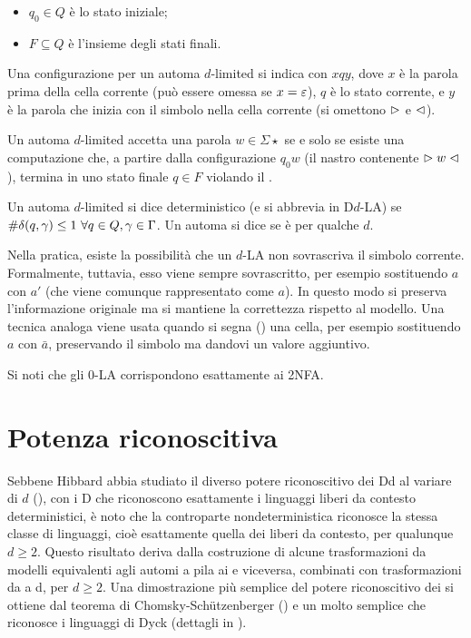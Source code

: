 \begin{defin}
\begin{itemize}
		\item $q_0\in Q$ è lo stato iniziale;
		\item $F\subseteq Q$ è l'insieme degli stati finali.
	\end{itemize}
	Una configurazione per un automa $d$-limited si indica con $xqy$, dove $x$ è la parola prima della cella corrente (può essere omessa se $x=\varepsilon$), $q$ è lo stato corrente, e $y$ è la parola che inizia con il simbolo nella cella corrente (si omettono $\vartriangleright$ e $\vartriangleleft$).

	Un automa $d$-limited accetta una parola $w\in\Sigma\star$ se e solo se esiste una computazione che, a partire dalla configurazione $q_0w$ (il nastro contenente $\vartriangleright w\vartriangleleft$), termina in uno stato finale $q\in F$ violando il .

	Un automa $d$-limited si dice deterministico (e si abbrevia in D$d$-LA) se $\# \delta(q,\gamma)\leq 1 ~ \forall q\in Q,\gamma\in\Gamma$. Un automa si dice  se è  per qualche $d$.
\end{defin}
Nella pratica, esiste la possibilità che un $d$-LA non sovrascriva il simbolo corrente. Formalmente, tuttavia, esso viene sempre sovrascritto, per esempio sostituendo $a$ con $a'$ (che viene comunque rappresentato come $a$). In questo modo si preserva l'informazione originale ma si mantiene la correttezza rispetto al modello. Una tecnica analoga viene usata quando si segna () una cella, per esempio sostituendo $a$ con $\bar a$, preservando il simbolo ma dandovi un valore aggiuntivo.

Si noti che gli 0-LA corrispondono esattamente ai 2NFA.



\section{Potenza riconoscitiva}
Sebbene Hibbard abbia studiato il diverso potere riconoscitivo dei D\la d al variare di $d$ (\cite{Hibbard:67:CFdet}), con i D che riconoscono esattamente i linguaggi liberi da contesto deterministici, è noto che la controparte nondeterministica riconosce la stessa classe di linguaggi, cioè esattamente quella dei liberi da contesto, per qualunque $d\geq2$. Questo risultato deriva dalla costruzione di alcune trasformazioni da modelli equivalenti agli automi a pila ai  e viceversa, combinati con trasformazioni da  a \la d, per $d\geq2$. Una dimostrazione più semplice del potere riconoscitivo dei  si ottiene dal teorema di Chomsky-Schützenberger (\cite{Chomsky:63:algebraCF}) e un  molto semplice che riconosce i linguaggi di Dyck (dettagli in \cite{Pighizzini:14:limitedRE}).

